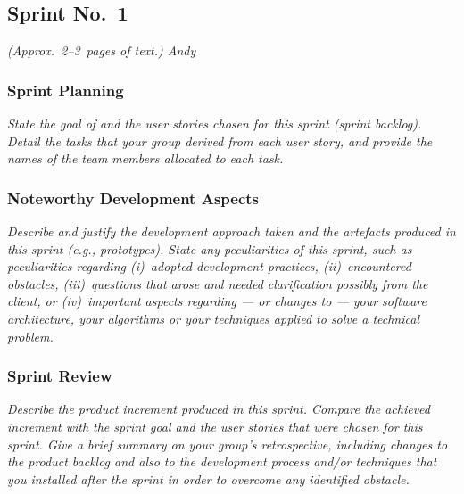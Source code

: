 
\subsection{Sprint No.~1}

\emph{(Approx.~2--3~pages of text.) Andy}

\subsubsection*{Sprint Planning}

\emph{State the goal of and the user stories chosen for this sprint (sprint backlog). Detail the tasks that your group derived from each user story, and provide the names of the team members allocated to each task.}

\subsubsection*{Noteworthy Development Aspects}

\emph{Describe and justify the development approach taken and the artefacts produced in this sprint (e.g., prototypes).  State any peculiarities of this sprint, such as peculiarities  regarding (i)~adopted development practices, (ii)~encountered obstacles, (iii)~questions that arose and needed clarification possibly from the client, or (iv)~important aspects regarding --- or changes to --- your software architecture, your algorithms or your techniques applied to solve a technical problem.}

\subsubsection*{Sprint Review}

\emph{Describe the product increment produced in this sprint. Compare the achieved increment with the sprint goal and the user stories that were chosen for this sprint. Give a brief summary on your group's retrospective, including changes to the product backlog and also to the development process and/or techniques that you installed after the sprint in order to overcome any identified obstacle.}
